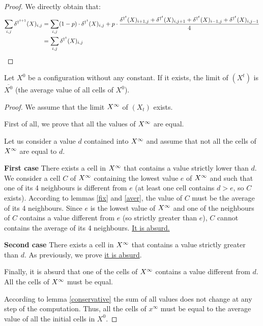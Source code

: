 \begin{proof}
  We directly obtain that:
  \[\begin{split}
    \sum_{i,j} \delta^{\dag^{t+1}}(X)_{i,j} & = \sum_{i,j} (1-p) \cdot \delta^{\dag^t}(X)_{i,j} + p \cdot \frac{\delta^{\dag^t}(X)_{i+1,j} + \delta^{\dag^t}(X)_{i,j+1} + \delta^{\dag^t}(X)_{i-1,j} + \delta^{\dag^t}(X)_{i,j-1}}{4} \\
        & = \sum_{i,j} \delta^{\dag^t}(X)_{i,j}
  \end{split} \]
\end{proof}

\begin{prop}
  \label{limnoc}
  Let $X^0$ be a configuration without any constant. If it exists, the limit of $(X^t)$ is $\overline{X^0}$ (the average value of all cells of $X^0$).
\end{prop}

\begin{proof}
  We assume that the limit $X^{\infty}$ of $(X_t)$ exists.
  
  First of all, we prove that all the values of $X^{\infty}$ are equal. 
  
  Let us consider a value $d$ contained into $X^{\infty}$ and assume that not all the cells of $X^{\infty}$ are equal to $d$.
  
  \textbf{First case} There exists a cell in $X^{\infty}$ that contains a value strictly lower than $d$. We consider a cell $C$ of $X^{\infty}$ containing the lowest value $e$ of $X^{\infty}$ and such that one of its 4 neighbours is different from $e$ (at least one cell contains $d > e$, so $C$ exists). According to lemmas \ref{fix} and \ref{aver}, the value of $C$ must be the average of its 4 neighbours. Since $e$ is the lowest value of $X^{\infty}$ and one of the neighbours of $C$ contains a value different from $e$ (so strictly greater than $e$), $C$ cannot contains the average of its 4 neighbours. \underline{It is absurd.}

  \textbf{Second case} There exists a cell in $X^{\infty}$ that contains a value strictly greater than $d$. As previously, we prove \underline{it is absurd}.
  
  Finally, it is absurd that one of the cells of $X^{\infty}$ contains a value different from $d$. All the cells of $X^{\infty}$ must be equal.
  
  According to lemma \ref{conservative} the sum of all values does not change at any step of the computation. Thus, all the cells of $x^{\infty}$ must be equal to the average value of all the initial cells in $X^0$.  
\end{proof}

